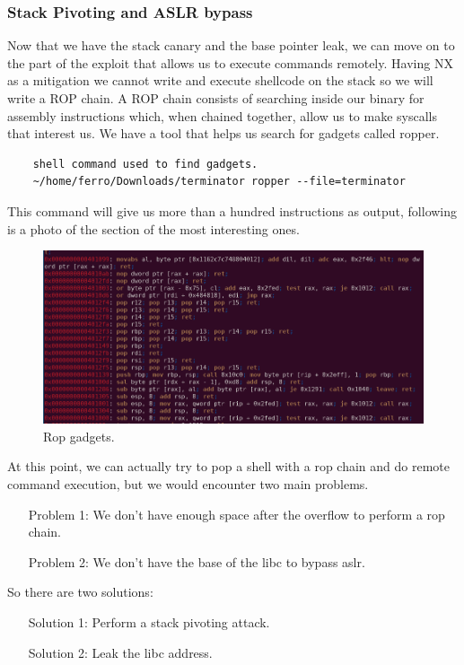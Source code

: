     \subsubsection{Stack Pivoting and ASLR bypass}
    Now that we have the stack canary and the base pointer leak, we can move on to the part of the exploit that allows us to execute commands remotely.\newline
    Having NX as a mitigation we cannot write and execute shellcode on the stack so we will write a ROP chain.
    A ROP chain consists of searching inside our binary for assembly instructions which, when chained together, allow us to make syscalls that interest us.\newline
    \clearpage
    We have a tool that helps us search for gadgets called ropper.\newline
    \begin{verbatim}
    shell command used to find gadgets.
    ~/home/ferro/Downloads/terminator ropper --file=terminator
    \end{verbatim}
    This command will give us more than a hundred instructions as output, following is a photo of the section of the most interesting ones.\newline
    \begin{figure}[htbp]
        \centering
        \includegraphics[width=1\linewidth]{Images/rop_gadget.png}
        \caption{Rop gadgets.}
        \label{fig:enter-label}
    \end{figure}
    
    At this point, we can actually try to pop a shell with a rop chain and do remote command execution, but we would encounter two main problems.\newline
    \begin{itemize}
        \item[Problem 1:] We don't have enough space after the overflow to perform a rop chain.
        \item[Problem 2:] We don't have the base of the libc to bypass aslr.
    \end{itemize}
    So there are two solutions: \newline
    \begin{itemize}
        \item[Solution 1:] Perform a stack pivoting attack.
        \item[Solution 2:] Leak  the libc address.
    \end{itemize}
    \clearpage
